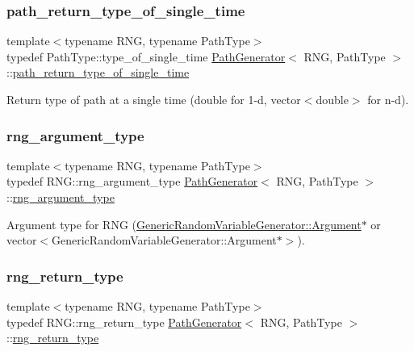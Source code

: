 \subsubsection{\texorpdfstring{path\+\_\+return\+\_\+type\+\_\+of\+\_\+single\+\_\+time}{path\_return\_type\_of\_single\_time}}
{\footnotesize\ttfamily template$<$typename R\+NG, typename Path\+Type$>$ \\
typedef Path\+Type\+::type\+\_\+of\+\_\+single\+\_\+time \hyperlink{class_path_generator}{Path\+Generator}$<$ R\+NG, Path\+Type $>$\+::\hyperlink{class_path_generator_a467bc3ddaa5e9104170550617e767349}{path\+\_\+return\+\_\+type\+\_\+of\+\_\+single\+\_\+time}}



Return type of path at a single time (double for 1-\/d, vector$<$double$>$ for n-\/d). 

\hypertarget{class_path_generator_a2f6a701b324534da9f05ccc11c320e6b}{}\label{class_path_generator_a2f6a701b324534da9f05ccc11c320e6b} 
\subsubsection{\texorpdfstring{rng\+\_\+argument\+\_\+type}{rng\_argument\_type}}
{\footnotesize\ttfamily template$<$typename R\+NG, typename Path\+Type$>$ \\
typedef R\+N\+G\+::rng\+\_\+argument\+\_\+type \hyperlink{class_path_generator}{Path\+Generator}$<$ R\+NG, Path\+Type $>$\+::\hyperlink{class_path_generator_a2f6a701b324534da9f05ccc11c320e6b}{rng\+\_\+argument\+\_\+type}}



Argument type for R\+NG (\hyperlink{class_generic_random_variable_generator_1_1_argument}{Generic\+Random\+Variable\+Generator\+::\+Argument}$\ast$ or vector$<$\+Generic\+Random\+Variable\+Generator\+::\+Argument$\ast$$>$). 

\hypertarget{class_path_generator_aa97ab7e55299daa0f38539816f171369}{}\label{class_path_generator_aa97ab7e55299daa0f38539816f171369} 
\subsubsection{\texorpdfstring{rng\+\_\+return\+\_\+type}{rng\_return\_type}}
{\footnotesize\ttfamily template$<$typename R\+NG, typename Path\+Type$>$ \\
typedef R\+N\+G\+::rng\+\_\+return\+\_\+type \hyperlink{class_path_generator}{Path\+Generator}$<$ R\+NG, Path\+Type $>$\+::\hyperlink{class_path_generator_aa97ab7e55299daa0f38539816f171369}{rng\+\_\+return\+\_\+type}}



